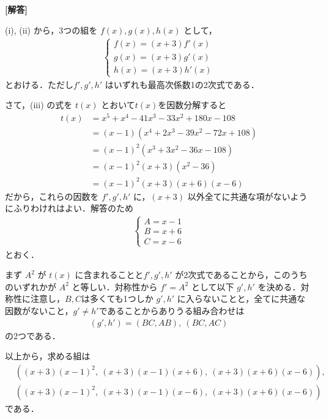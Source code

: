 \documentclass[../../main.tex]{subfiles}
\begin{document}
\begin{oframed}
  
\end{oframed}

{\bf [解答]}

(i), (ii) から，3つの組を $f(x), g(x), h(x)$ として，
\begin{align}
  \begin{cases}
    f(x) = (x+3) f'(x) \\
    g(x) = (x+3) g'(x) \\
    h(x) = (x+3) h'(x)
  \end{cases}
\end{align}
とおける．ただし$f', g', h'$ はいずれも最高次係数1の2次式である．

さて，(iii) の式を $t(x)$ とおいて$t(x)$を因数分解すると
\begin{align}
  t(x)
  &= x^5+x^4-41x^3-33x^2+180x-108 \\
  &= (x-1)(x^4 + 2x^3 - 39x^2 - 72x + 108) \\
  &= (x-1)^2 (x^3 + 3x^2 - 36x - 108) \\
  &= (x-1)^2 (x+3)(x^2 - 36) \\
  &= (x-1)^2 (x+3)(x+6)(x-6)
\end{align}
だから，これらの因数を $f', g', h'$ に，$(x+3)$ 以外全てに共通な項がないようにふりわけれはよい．解答のため
\begin{align}
  \begin{cases}
    A = x-1 \\
    B = x+6 \\
    C = x-6
  \end{cases}
\end{align}
とおく．

まず $A^2$ が $t(x)$ に含まれることと$f', g', h'$ が2次式であることから，このうちのいずれかが $A^2$ と等しい．対称性から $f' = A^2$ として以下 $g', h'$ を決める．対称性に注意し，$B,C$は多くても1つしか $g', h'$ に入らないことと，全てに共通な因数がないこと，$g' \neq h'$であることからありうる組み合わせは
\begin{align}
  (g', h') = (BC, AB), \ (BC, AC)
\end{align}
の2つである．

以上から，求める組は
\begin{align}
  &\left( (x+3)(x-1)^2, \ (x+3)(x-1)(x+6), \ (x+3)(x+6)(x-6) \right), \\
  &\left( (x+3)(x-1)^2, \ (x+3)(x-1)(x-6), \ (x+3)(x+6)(x-6) \right)
\end{align}
である．
\end{document}
